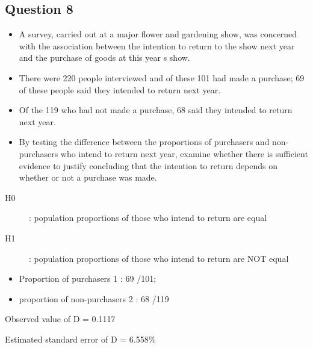 \documentclass[]{report}
\begin{document}
\subsection*{Question 8} 

\begin{itemize}
\item 
A survey, carried out at a major flower and gardening show, was concerned with the association between the intention to return to the show next year and the purchase of goods at this year s show.
\item There were 220 people interviewed and of these 101 had made a purchase; 69 of these people said they intended to return next year. 
\item Of the 119 who had not made a purchase, 68 said they intended to return next year.
\item By testing the difference between the proportions of purchasers and non-purchasers who intend to return next year, examine whether there is sufficient evidence to justify concluding that the intention to return depends on whether or not a purchase was made.
\end{itemize}

\begin{description}
\item[H0]: population proportions of those who intend to return are equal
\item[H1]: population proportions of those who intend to return are NOT equal
\end{description}

\begin{itemize}
\item Proportion of purchasers 1 :  69 /101; 
\item proportion of non-purchasers 2 : 68 /119
\end{itemize}


Observed value of D = 0.1117


Estimated standard error of D = 6.558\%
\end{document}
